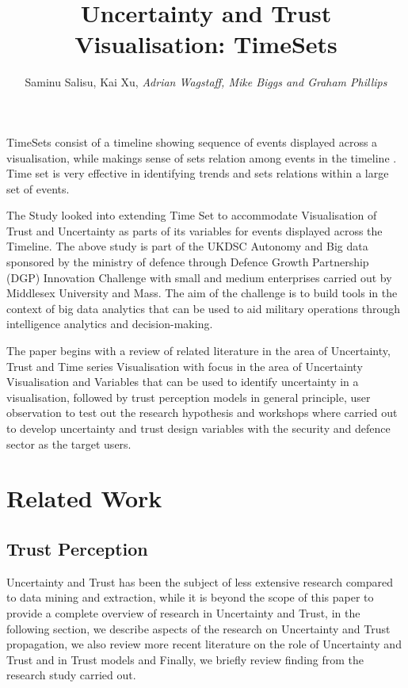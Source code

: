 \documentclass[journal]{vgtc}                %
\title{Uncertainty and Trust Visualisation: TimeSets}
\author{Saminu Salisu, Kai Xu, \textit{Adrian Wagstaff, Mike Biggs and Graham Phillips}}
\begin{document}

\maketitle
TimeSets consist of a timeline showing sequence of events displayed across a visualisation, while makings sense of sets relation among events in the timeline \cite{timesets}. Time set is very effective in identifying trends and sets relations within a large set of events. 

The Study looked into extending Time Set to accommodate Visualisation of Trust and Uncertainty as parts of its variables for events displayed across the Timeline. The above study is part of the UKDSC Autonomy and Big data sponsored by the ministry of defence through Defence Growth Partnership (DGP) Innovation Challenge with small and medium enterprises carried out by Middlesex University and Mass. The aim of the challenge is to build tools in the context of big data analytics that can be used to aid military operations through intelligence analytics and decision-making. 

The paper begins with a review of related literature in the area of Uncertainty, Trust and Time series Visualisation with focus in the area of Uncertainty Visualisation and Variables that can be used to identify uncertainty in a visualisation, followed by trust perception models in general principle, user observation to test out the research hypothesis and workshops where carried out to develop uncertainty and trust design variables with the security and defence sector as the target users.

\section{Related Work}

\subsection{Trust Perception}

Uncertainty and Trust has been the subject of less extensive research compared to data mining and extraction, while it is beyond the scope of this paper to provide a complete overview of research in Uncertainty and Trust, in the following section, we describe aspects of the research on Uncertainty and Trust propagation, we also review more recent literature on the role of Uncertainty and Trust and in Trust models and Finally, we briefly review finding from the research study carried out.
\end{document}
